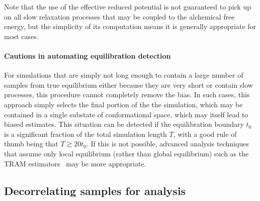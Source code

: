\documentclass[9pt,bestpractices]{livecoms}
\begin{document}
Note that the use of the effective reduced potential is not guaranteed to pick up on all slow relaxation processes that may be coupled to the alchemical free energy, but the simplicity of its computation means it is generally appropriate for most cases.

\paragraph{Cautions in automating equilibration detection}
For simulations that are simply not long enough to contain a large number of samples from true equilibrium either because they are very short or contain slow processes, this procedure cannot completely remove the bias.
In such cases, this approach simply selects the final portion of the the simulation, which may be contained in a single substate of conformational space, which may itself lead to biased estimates. 
This situation can be detected if the equilibration boundary $t_0$ is a significant fraction of the total simulation length $T$, with a good rule of thumb being that $T \gtrsim 20 t_0$.
If this is not possible, advanced analysis techniques that assume only local equilibrium (rather than global equilibrium) such as the TRAM estimators~\cite{mey2014xtram,wu2016multiensemble,nuske2017markov} may be more appropriate.

\subsection{Decorrelating samples for analysis}
\label{sec:decorrelating-samples}
\end{document}
